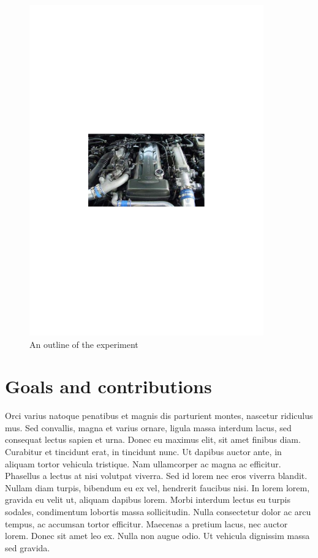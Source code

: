 \begin{figure}
  \begin{center}
    \leavevmode
  \includegraphics[width=0.9\textwidth]{Images/MK4_supra_engine_bay}
    \caption{An outline of the experiment}
    \label{fig:experiment_outline}
  \end{center}
\end{figure}


\section{Goals and contributions} %
\label{sec:goals_and_contributions}

Orci varius natoque penatibus et magnis dis parturient montes, nascetur ridiculus mus. Sed convallis, magna et varius ornare, ligula massa interdum lacus, sed consequat lectus sapien et urna. Donec eu maximus elit, sit amet finibus diam. Curabitur et tincidunt erat, in tincidunt nunc. Ut dapibus auctor ante, in aliquam tortor vehicula tristique. Nam ullamcorper ac magna ac efficitur. Phasellus a lectus at nisi volutpat viverra. Sed id lorem nec eros viverra blandit. Nullam diam turpis, bibendum eu ex vel, hendrerit faucibus nisi. In lorem lorem, gravida eu velit ut, aliquam dapibus lorem. Morbi interdum lectus eu turpis sodales, condimentum lobortis massa sollicitudin. Nulla consectetur dolor ac arcu tempus, ac accumsan tortor efficitur. Maecenas a pretium lacus, nec auctor lorem. Donec sit amet leo ex. Nulla non augue odio. Ut vehicula dignissim massa sed gravida.

